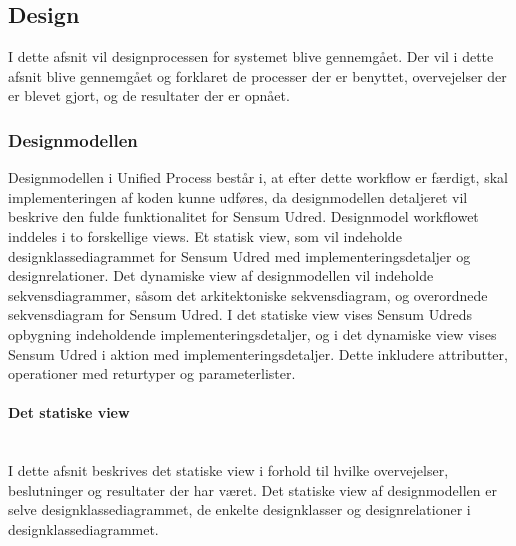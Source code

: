 \documentclass[../../main.tex]{subfiles}
\begin{document}
\subsection{Design}
I dette afsnit vil designprocessen for systemet blive gennemgået. Der vil i dette afsnit blive gennemgået og forklaret de processer der er benyttet, overvejelser der er blevet gjort, og de resultater der er opnået.

\subsubsection{Designmodellen}
Designmodellen i Unified Process består i, at efter dette workflow er færdigt, skal implementeringen af koden kunne udføres, da designmodellen detaljeret vil beskrive den fulde funktionalitet for Sensum Udred. Designmodel workflowet inddeles i to forskellige views. Et statisk view, som vil indeholde designklassediagrammet for Sensum Udred med implementeringsdetaljer og designrelationer. Det dynamiske view af designmodellen vil indeholde sekvensdiagrammer, såsom det arkitektoniske sekvensdiagram, og overordnede sekvensdiagram for Sensum Udred. I det statiske view vises Sensum Udreds opbygning indeholdende implementeringsdetaljer, og i det dynamiske view vises Sensum Udred i aktion med implementeringsdetaljer. Dette inkludere attributter, operationer med returtyper og parameterlister.

\paragraph{Det statiske view}\mbox{} \\
I dette afsnit beskrives det statiske view i forhold til hvilke overvejelser, beslutninger og resultater der har været. Det statiske view af designmodellen er selve designklassediagrammet, de enkelte designklasser og designrelationer i designklassediagrammet. 
\end{document}
